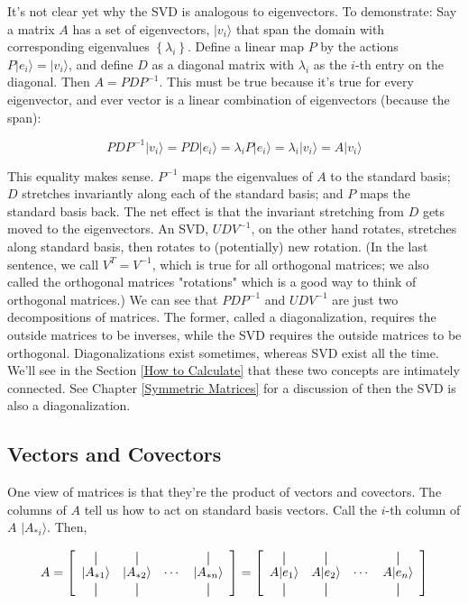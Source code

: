 \documentclass{amsbook}
\newcommand*{\vertbar}{\rule[-1ex]{0.5pt}{2.5ex}}
\begin{document}
It's not clear yet why the SVD is analogous to eigenvectors.  To demonstrate:  Say a matrix $A$ has a set of eigenvectors, $|v_i\rangle$ that span the domain with corresponding eigenvalues $\left\{\lambda_i\right\}$.  Define a linear map $P$ by the actions $P|e_i\rangle=|v_i\rangle$, and define $D$ as a diagonal matrix with $\lambda_i$ as the $i$-th entry on the diagonal.  Then $A=PDP^{-1}$.  This must be true because it's true for every eigenvector, and ever vector is a linear combination of eigenvectors (because the span):

$$
PDP^{-1}|v_i\rangle = PD|e_i\rangle = \lambda_iP|e_i\rangle = \lambda_i|v_i\rangle = A|v_i\rangle
$$

This equality makes sense.  $P^{-1}$ maps the eigenvalues of $A$ to the standard basis; $D$ stretches invariantly along each of the standard basis; and $P$ maps the standard basis back.  The net effect is that the invariant stretching from $D$ gets moved to the eigenvectors.  An SVD, $UDV^{-1}$, on the other hand rotates, stretches along standard basis, then rotates to (potentially) new rotation.  (In the last sentence, we call $V^T=V^{-1}$, which is true for all orthogonal matrices; we also called the orthogonal matrices "rotations" which is a good way to think of orthogonal matrices.)  We can see that $PDP^{-1}$ and $UDV^{-1}$ are just two decompositions of matrices.  The former, called a diagonalization, requires the outside matrices to be inverses, while the SVD requires the outside matrices to be orthogonal.  Diagonalizations exist sometimes, whereas SVD exist all the time.  We'll see in the Section \ref{How to Calculate} that these two concepts are intimately connected.  See Chapter \ref{Symmetric Matrices} for a discussion of then the SVD is also a diagonalization.

\subsection{Vectors and Covectors}

One view of matrices is that they're the product of vectors and covectors.  The columns of $A$ tell us how to act on standard basis vectors.  Call the $i$-th column of $A$ $|A_{*i}\rangle$.  Then,

$$
A = 
\left[
  \begin{array}{cccc}
    \vertbar & \vertbar & & \vertbar \\
    |A_{*1}\rangle  & |A_{*2}\rangle & \cdots & |A_{*n}\rangle \\
    \vertbar & \vertbar & & \vertbar 
  \end{array}
\right] =
\left[
  \begin{array}{cccc}
    \vertbar & \vertbar & & \vertbar \\
    A|e_1\rangle    & A|e_2\rangle   & \cdots & A|e_n\rangle    \\
    \vertbar & \vertbar & & \vertbar 
  \end{array}
\right]
$$
\end{document}

